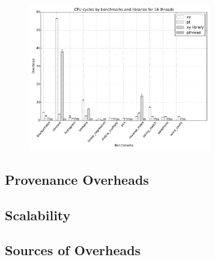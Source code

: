 \begin{figure}[h]
\includegraphics[width=8cm]{figure/benchmarks/cpu-cycles-16-threads.pdf}
\end{figure}

%

\subsection{Provenance Overheads}



\subsection{\projecttitle Scalability}




\subsection{Sources of Overheads}




